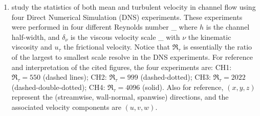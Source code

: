 \documentclass[11pt]{article}
\begin{document}
\begin{enumerate}[label=(\alph*)]

    \item \cite{bernardini_etal2014} study the statistics of both mean and turbulent
        velocity in channel flow using four Direct Numerical Simulation (DNS) experiments.
        These experiments were performed in four different Reynolds number
        \beq
            \Re_\tau {} {}\com
        \eeq
        where $h$ is the channel half-width, and $\delta_\nu$ is the viscous velocity scale
        \beq
            \delta_\nu {} {}\com
        \eeq
        with $\nu$ the kinematic viscosity and $u_\tau$ the frictional velocity. Notice
        that $\Re_\tau$ is essentially the ratio of the largest to smallest scale resolve
        in the DNS experiments. For reference and interpretation of the cited figures,
        the four experiments are: CH1: $\Re_\tau = 550$ (dashed lines); CH2: $\Re_\tau = 999$
        (dashed-dotted); CH3: $\Re_\tau = 2022$ (dashed-double-dotted); CH4: $\Re_\tau = 4096$ 
        (solid). Also for reference, $(x,y,z)$ represent the (streamwise, wall-normal, spanwise)
        directions, and the associated velocity components are $(u, v, w)$.


\end{enumerate}
\end{document}
